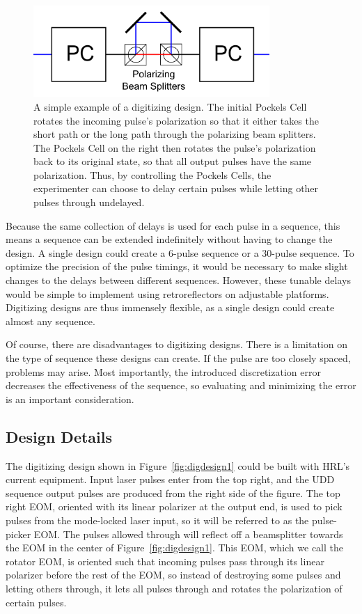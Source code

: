 \documentclass[pdftex,12pt,a4paper]{article}
\begin{document}
 \begin{figure}[t]
\centering
\includegraphics[width=0.8\textwidth]{simple_digitizing.png}
\caption{A simple example of a digitizing design. The initial Pockels Cell rotates the incoming pulse's polarization so that it either takes the short path or the long path through the polarizing beam splitters. The Pockels Cell on the right then rotates the pulse's polarization back to its original state, so that all output pulses have the same polarization. Thus, by controlling the Pockels Cells, the experimenter can choose to delay certain pulses while letting other pulses through undelayed.}
\label{fig:simple}
\end{figure}
    
Because the same collection of delays is used for each pulse in a sequence, this means a sequence can be extended indefinitely without having to change the design. A single design could create a 6-pulse sequence or a 30-pulse sequence. To optimize the precision of the pulse timings, it would be necessary to make slight changes to the delays between different sequences. However, these tunable delays would be simple to implement using retroreflectors on adjustable platforms. Digitizing designs are thus immensely flexible, as a single design could create almost any sequence. 
    
Of course, there are disadvantages to digitizing designs. There is a limitation on the type of sequence these designs can create. If the pulse are too closely spaced, problems may arise. Most importantly, the introduced discretization error decreases the effectiveness of the sequence, so evaluating and minimizing the error is an important consideration.

\subsection{Design Details}

The digitizing design shown in Figure~\ref{fig:digdesign1} could be built with HRL's current equipment. Input laser pulses enter from the top right, and the UDD sequence output pulses are produced from the right side of the figure. The top right EOM, oriented with its linear polarizer at the output end, is used to pick pulses from the mode-locked laser input, so it will be referred to as the pulse-picker EOM. The pulses allowed through will reflect off a beamsplitter towards the EOM in the center of Figure~\ref{fig:digdesign1}. This EOM, which we call the rotator EOM, is oriented such that incoming pulses pass through its linear polarizer before the rest of the EOM, so instead of destroying some pulses and letting others through, it lets all pulses through and rotates the polarization of certain pulses. 
\end{document}
